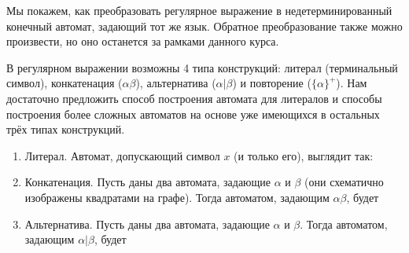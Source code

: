 \documentclass[12pt,a4paper,oneside]{article}
\begin{document}
Мы покажем, как преобразовать регулярное выражение в недетерминированный конечный автомат, задающий 
тот же язык. 
Обратное преобразование также можно произвести, но оно останется за рамками данного курса.

В регулярном выражении возможны 4 типа конструкций: литерал (терминальный символ),
конкатенация ($\alpha\beta$), альтернатива ($\alpha|\beta$)
и повторение ($\{\alpha\}^+$). Нам достаточно предложить способ построения автомата для
литералов и способы построения более сложных автоматов на основе уже имеющихся в остальных 
трёх типах конструкций. 

\begin{enumerate}
\item Литерал. Автомат, допускающий символ $x$ (и только его), выглядит так:


\item Конкатенация. Пусть даны два автомата, задающие $\alpha$ и $\beta$ 
(они схематично изображены квадратами на графе).
Тогда автоматом, задающим $\alpha\beta$, будет


\item Альтернатива. Пусть даны два автомата, задающие $\alpha$ и $\beta$.
Тогда автоматом, задающим $\alpha|\beta$, будет


\end{enumerate}
\end{document}
